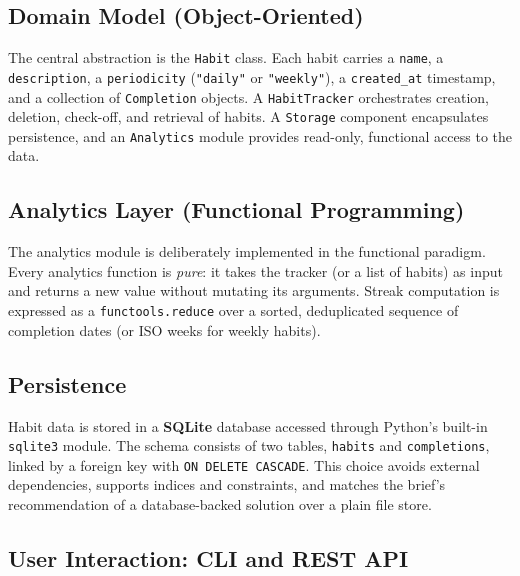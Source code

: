 \documentclass[11pt,a4paper]{article}
\begin{document}
\noindent


\subsection{Domain Model (Object-Oriented)}

The central abstraction is the \texttt{Habit} class. Each habit carries a
\texttt{name}, a \texttt{description}, a \texttt{periodicity}
(\texttt{"daily"} or \texttt{"weekly"}), a \texttt{created\_at} timestamp,
and a collection of \texttt{Completion} objects. A \texttt{HabitTracker}
orchestrates creation, deletion, check-off, and retrieval of habits. A
\texttt{Storage} component encapsulates persistence, and an
\texttt{Analytics} module provides read-only, functional access to the data.

\medskip
\noindent


\subsection{Analytics Layer (Functional Programming)}

The analytics module is deliberately implemented in the functional paradigm.
Every analytics function is \emph{pure}: it takes the tracker (or a list of
habits) as input and returns a new value without mutating its arguments.
Streak computation is expressed as a \texttt{functools.reduce} over a sorted,
deduplicated sequence of completion dates (or ISO weeks for weekly habits).

\medskip
\noindent


\subsection{Persistence}

Habit data is stored in a \textbf{SQLite} database accessed through Python's
built-in \texttt{sqlite3} module. The schema consists of two tables,
\texttt{habits} and \texttt{completions}, linked by a foreign key with
\texttt{ON DELETE CASCADE}. This choice avoids external dependencies, supports
indices and constraints, and matches the brief's recommendation of a
database-backed solution over a plain file store.

\medskip
\noindent


\subsection{User Interaction: CLI and REST API}
\end{document}

